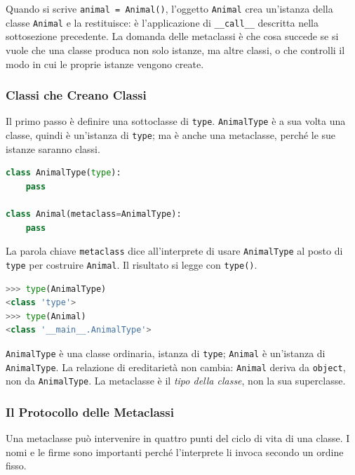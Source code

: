\documentclass[12pt]{extarticle}
\begin{document}
\noindent Quando si scrive \texttt{animal = Animal()}, l'oggetto \texttt{Animal} crea un'istanza della classe \texttt{Animal} e la restituisce: è l'applicazione di \texttt{\_\_call\_\_} descritta nella sottosezione precedente. La domanda delle metaclassi è che cosa succede se si vuole che una classe produca non solo istanze, ma altre classi, o che controlli il modo in cui le proprie istanze vengono create.

\subsubsection{Classi che Creano Classi}

\noindent Il primo passo è definire una sottoclasse di \texttt{type}. \texttt{AnimalType} è a sua volta una classe, quindi è un'istanza di \texttt{type}; ma è anche una metaclasse, perché le sue istanze saranno classi.

\begin{lstlisting}[language=Python]
class AnimalType(type):
    pass

class Animal(metaclass=AnimalType):
    pass
\end{lstlisting}

\noindent La parola chiave \texttt{metaclass} dice all'interprete di usare \texttt{AnimalType} al posto di \texttt{type} per costruire \texttt{Animal}. Il risultato si legge con \texttt{type()}.

\begin{lstlisting}[language=Python]
>>> type(AnimalType)
<class 'type'>
>>> type(Animal)
<class '__main__.AnimalType'>
\end{lstlisting}

\noindent \texttt{AnimalType} è una classe ordinaria, istanza di \texttt{type}; \texttt{Animal} è un'istanza di \texttt{AnimalType}. La relazione di ereditarietà non cambia: \texttt{Animal} deriva da \texttt{object}, non da \texttt{AnimalType}. La metaclasse è il \emph{tipo della classe}, non la sua superclasse.

\subsubsection{Il Protocollo delle Metaclassi}

\noindent Una metaclasse può intervenire in quattro punti del ciclo di vita di una classe. I nomi e le firme sono importanti perché l'interprete li invoca secondo un ordine fisso.
\end{document}

